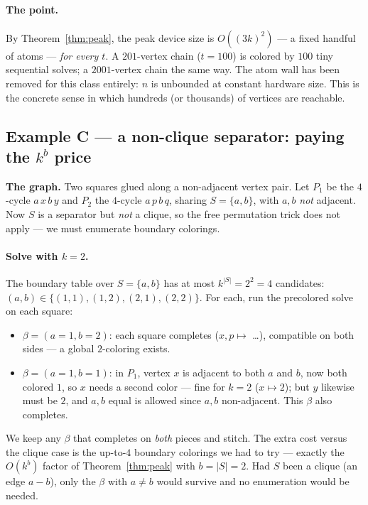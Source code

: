 \documentclass[11pt]{article}
\theoremstyle{definition}
\theoremstyle{remark}
\begin{document}
\paragraph{The point.} By Theorem~\ref{thm:peak}, the peak device size is
$O((3k)^2)$ --- a fixed handful of atoms --- \emph{for every $t$}. A $201$-vertex
chain ($t=100$) is colored by $100$ tiny sequential solves; a $2001$-vertex chain
the same way. The atom wall has been removed for this class entirely: $n$ is
unbounded at constant hardware size. This is the concrete sense in which hundreds
(or thousands) of vertices are reachable.

\subsection{Example C --- a non-clique separator: paying the $k^{b}$ price}

\textbf{The graph.} Two squares glued along a non-adjacent vertex pair. Let
$P_1$ be the $4$-cycle $a\,x\,b\,y$ and $P_2$ the $4$-cycle $a\,p\,b\,q$, sharing
$S=\{a,b\}$, with $a,b$ \emph{not} adjacent. Now $S$ is a separator but \emph{not}
a clique, so the free permutation trick does not apply --- we must enumerate
boundary colorings.

\begin{center}
\end{center}

\paragraph{Solve with $k=2$.} The boundary table over $S=\{a,b\}$ has at most
$k^{|S|}=2^2=4$ candidates: $(a,b)\in\{(1,1),(1,2),(2,1),(2,2)\}$. For each, run the
precolored solve on each square:
\begin{itemize}[leftmargin=1.4em,itemsep=1pt]
  \item $\beta=(a{=}1,b{=}2)$: each square completes ($x,p\mapsto$ \dots), compatible
        on both sides --- a global $2$-coloring exists. \checkmark
  \item $\beta=(a{=}1,b{=}1)$: in $P_1$, vertex $x$ is adjacent to both $a$ and $b$,
        now both colored $1$, so $x$ needs a second color --- fine for $k=2$
        ($x\mapsto2$); but $y$ likewise must be $2$, and $a,b$ equal is allowed since
        $a,b$ non-adjacent. This $\beta$ also completes. \checkmark
\end{itemize}
We keep any $\beta$ that completes on \emph{both} pieces and stitch. The extra cost
versus the clique case is the up-to-$4$ boundary colorings we had to try ---
exactly the $O(k^{b})$ factor of Theorem~\ref{thm:peak} with $b=|S|=2$. Had $S$
been a clique (an edge $a\!-\!b$), only the $\beta$ with $a\ne b$ would survive and
no enumeration would be needed.
\end{document}
